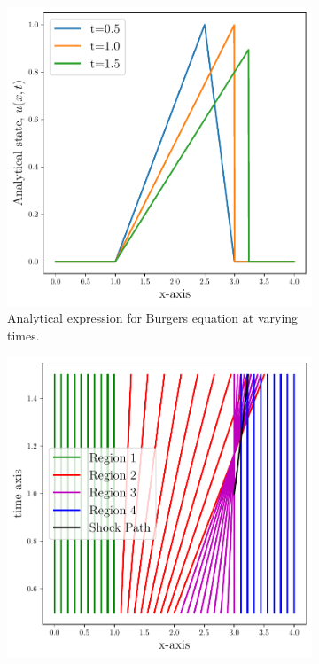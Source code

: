 \begin{adjustwidth}{2.5em}{0pt}
    \begin{figure}[h]
        \centering
        \begin{subfigure}[b]{0.45\linewidth}
            \centering
            \includegraphics[width = \linewidth]{q1/analytical.pdf}
            \caption{Analytical expression for Burgers equation at varying times.}
            \label{fig:analytical}
        \end{subfigure}
        \begin{subfigure}[b]{0.45\linewidth}
            \centering
            \includegraphics[width = \linewidth]{q1/characteristics.pdf}

\end{subfigure}
\end{figure}
\end{adjustwidth}
